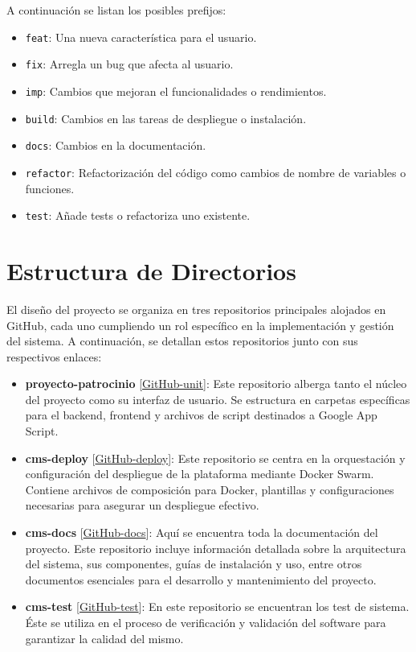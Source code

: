 A continuación se listan los posibles prefijos:

\begin{itemize}
    \item \texttt{feat}: Una nueva característica para el usuario.
    \item \texttt{fix}: Arregla un bug que afecta al usuario.
    \item \texttt{imp}: Cambios que mejoran el funcionalidades o rendimientos.
    \item \texttt{build}: Cambios en las tareas de despliegue o instalación.
    \item \texttt{docs}: Cambios en la documentación.
    \item \texttt{refactor}: Refactorización del código como cambios de nombre de variables o funciones.
    \item \texttt{test}: Añade tests o refactoriza uno existente.
\end{itemize}



\section{Estructura de Directorios}\label{sec:estr-directory}

El diseño del proyecto se organiza en tres repositorios principales alojados en GitHub, cada uno cumpliendo un rol específico en la implementación y gestión del sistema. A continuación, se detallan estos repositorios junto con sus respectivos enlaces:

\begin{itemize}
    \item \textbf{proyecto-patrocinio} [\href{https://github.com/proyecto-patrocinio}{GitHub-unit}]: Este repositorio alberga tanto el núcleo del proyecto como su interfaz de usuario. Se estructura en carpetas específicas para el backend, frontend y archivos de script destinados a Google App Script.
    
    \item \textbf{cms-deploy} [\href{https://github.com/proyecto-patrocinio/cms-deploy}{GitHub-deploy}]: Este repositorio se centra en la orquestación y configuración del despliegue de la plataforma mediante Docker Swarm. Contiene archivos de composición para Docker, plantillas y configuraciones necesarias para asegurar un despliegue efectivo.
    
    \item \textbf{cms-docs} [\href{https://github.com/proyecto-patrocinio/cms-docs}{GitHub-docs}]: Aquí se encuentra toda la documentación del proyecto. Este repositorio incluye información detallada sobre la arquitectura del sistema, sus componentes, guías de instalación y uso, entre otros documentos esenciales para el desarrollo y mantenimiento del proyecto.

    \item \textbf{cms-test} [\href{https://github.com/proyecto-patrocinio/cms-test}{GitHub-test}]: En este repositorio se encuentran los test de sistema. Éste se utiliza en el proceso de verificación y validación del software para garantizar la calidad del mismo.
\end{itemize}

